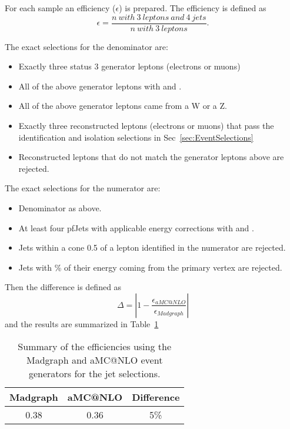 For each sample an efficiency ($\epsilon$) is prepared. The efficiency is defined as
\begin{equation}
\epsilon = \frac{n\ with\ 3\ leptons\ and\ 4\ jets}{n\ with\ 3\ leptons}.
\end{equation}

The exact selections for the denominator are:
\begin{itemize}
\item Exactly three status 3 generator leptons (electrons or muons)
\item All of the above generator leptons with \pt {} \GeV and \aeta {}.
\item All of the above generator leptons came from a W or a Z.
\item Exactly three reconstructed leptons (electrons or muons) that pass the identification and isolation selections in Sec~\ref{sec:EventSelections}
\item Reconstructed leptons that do not match the generator leptons above are rejected.
\end{itemize}

The exact selections for the numerator are:
\begin{itemize}
\item Denominator as above.
\item At least four pfJets with applicable energy corrections with \pt {} \GeV and \aeta {}. 
\item Jets within a cone 0.5 of a lepton identified in the numerator are rejected.
\item Jets with \% of their energy coming from the primary vertex are rejected.
\end{itemize}

Then the difference is defined as
\begin{equation}
\Delta = \left| 1 - \frac{\epsilon _{aMC@NLO}}{\epsilon _{Madgraph}} \right|
\end{equation}
and the results are summarized in Table~\ref{tab:systgeneratorsum}

\begin{table}[h]
\caption{\label{tab:systgeneratorsum} Summary of the efficiencies using the Madgraph and aMC@NLO event generators for the jet selections.}
\begin{center}
\begin{tabular}{ccc}\hline
Madgraph           &  aMC@NLO & Difference \\ \hline
0.38                      & 0.36              & 5\%\\
\hline
\end{tabular}
\end{center}
\end{table}


